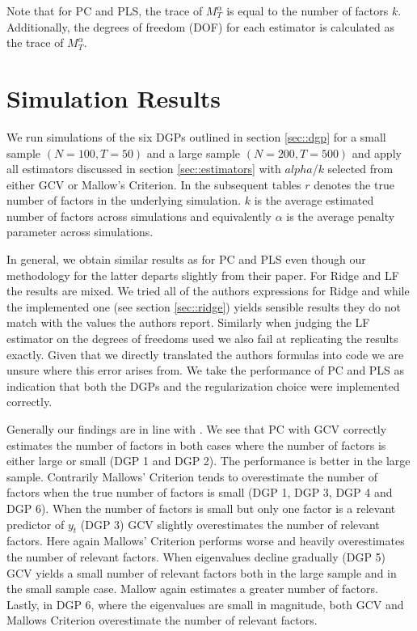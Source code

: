 Note that for PC and PLS, the trace of $M_{T}^{\alpha}$ is equal to the number of factors $k$. Additionally, the degrees of freedom (DOF) for each estimator is calculated as the trace of $M_{T}^{\alpha}$. 

\section{Simulation Results}

We run simulations of the six DGPs outlined in section \ref{sec::dgp} for a small sample $(N = 100, T = 50)$ and a large sample $(N=200, T=500)$ and apply all estimators discussed in section \ref{sec::estimators} with $alpha$/$k$ selected from either GCV or Mallow's Criterion. In the subsequent tables $r$ denotes the true number of factors in the underlying simulation. $k$ is the average estimated number of factors across simulations and equivalently $\alpha$ is the average penalty parameter across simulations.



In general, we obtain similar results as \citeauthor{carrasco2016sample} for PC and PLS even though our methodology for the latter departs slightly from their paper. For Ridge and LF the results are mixed. We tried all of the authors expressions for Ridge and while the implemented one (see section \ref{sec::ridge}) yields sensible results they do not match with the values the authors report. Similarly when judging the LF estimator on the degrees of freedoms used we also fail at replicating the results exactly. Given that we directly translated the authors formulas into code we are unsure where this error arises from. We take the performance of PC and PLS as indication that both the DGPs and the regularization choice were implemented correctly. 

Generally our findings are in line with \citeauthor{carrasco2016sample}. We see that PC with GCV correctly estimates the number of factors  in both cases where the number of factors is either large or small (DGP 1 and DGP 2). The performance is better in the large sample. Contrarily Mallows' Criterion tends to overestimate the number of factors when the true number of factors is small (DGP 1, DGP 3, DGP 4 and DGP 6). When the number of factors is small but only one factor is a relevant predictor of $y_t$ (DGP 3) GCV slightly overestimates the number of relevant factors. Here again Mallows' Criterion performs worse and heavily overestimates the number of relevant factors. When eigenvalues decline gradually (DGP 5) GCV yields a small number of relevant factors both in the large sample and in the small sample case. Mallow again estimates a greater number of factors. Lastly, in DGP 6, where the eigenvalues are small in magnitude, both GCV and Mallows Criterion overestimate the number of relevant factors. 

